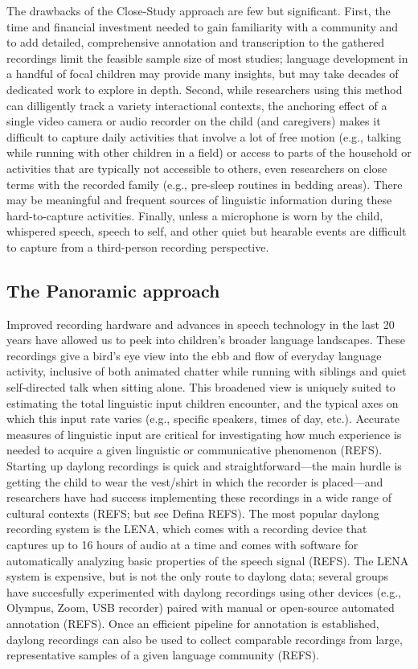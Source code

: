 \documentclass[,man,floatsintext]{apa6}
\begin{document}
The drawbacks of the Close-Study approach are few but significant.
First, the time and financial investment needed to gain familiarity with
a community and to add detailed, comprehensive annotation and
transcription to the gathered recordings limit the feasible sample size
of most studies; language development in a handful of focal children may
provide many insights, but may take decades of dedicated work to explore
in depth. Second, while researchers using this method can dilligently
track a variety interactional contexts, the anchoring effect of a single
video camera or audio recorder on the child (and caregivers) makes it
difficult to capture daily activities that involve a lot of free motion
(e.g., talking while running with other children in a field) or access
to parts of the household or activities that are typically not
accessible to others, even researchers on close terms with the recorded
family (e.g., pre-sleep routines in bedding areas). There may be
meaningful and frequent sources of linguistic information during these
hard-to-capture activities. Finally, unless a microphone is worn by the
child, whispered speech, speech to self, and other quiet but hearable
events are difficult to capture from a third-person recording
perspective.

\subsection{The Panoramic approach}\label{the-panoramic-approach}

Improved recording hardware and advances in speech technology in the
last 20 years have allowed us to peek into children's broader language
landscapes. These recordings give a bird's eye view into the ebb and
flow of everyday language activity, inclusive of both animated chatter
while running with siblings and quiet self-directed talk when sitting
alone. This broadened view is uniquely suited to estimating the total
linguistic input children encounter, and the typical axes on which this
input rate varies (e.g., specific speakers, times of day, etc.).
Accurate measures of linguistic input are critical for investigating how
much experience is needed to acquire a given linguistic or communicative
phenomenon (REFS). Starting up daylong recordings is quick and
straightforward---the main hurdle is getting the child to wear the
vest/shirt in which the recorder is placed---and researchers have had
success implementing these recordings in a wide range of cultural
contexts (REFS; but see Defina REFS). The most popular daylong recording
system is the LENA, which comes with a recording device that captures up
to 16 hours of audio at a time and comes with software for automatically
analyzing basic properties of the speech signal (REFS). The LENA system
is expensive, but is not the only route to daylong data; several groups
have succesfully experimented with daylong recordings using other
devices (e.g., Olympus, Zoom, USB recorder) paired with manual or
open-source automated annotation (REFS). Once an efficient pipeline for
annotation is established, daylong recordings can also be used to
collect comparable recordings from large, representative samples of a
given language community (REFS).
\end{document}
